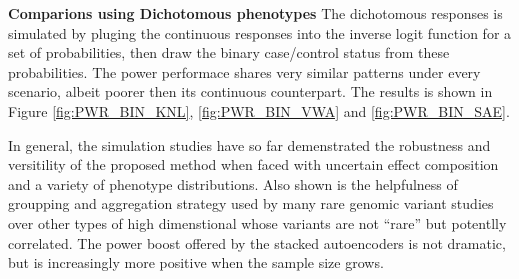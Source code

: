 \textbf{Comparions using Dichotomous phenotypes}
The dichotomous responses is simulated by pluging the continuous responses into the inverse logit function for a set of probabilities, then draw the binary case/control status from these probabilities. The power performace shares very similar patterns under every scenario, albeit poorer then its continuous counterpart. The results is shown in Figure \ref{fig:PWR_BIN_KNL}, \ref{fig:PWR_BIN_VWA} and \ref{fig:PWR_BIN_SAE}.

In general, the simulation studies have so far demenstrated the robustness and versitility of the proposed method when faced with uncertain effect composition and a variety of phenotype distributions. Also shown is the helpfulness of groupping and aggregation strategy used by many rare genomic variant studies over other types of high dimenstional whose variants are not ``rare'' but potentlly correlated. The power boost offered by the stacked autoencoders is not dramatic, but is increasingly more positive when the sample size grows.


